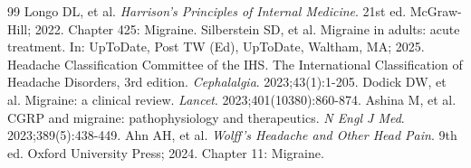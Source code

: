 \begin{thebibliography}{99}
 Longo DL, et al. \emph{Harrison's Principles of Internal Medicine}. 21st ed. McGraw-Hill; 2022. Chapter 425: Migraine.
 Silberstein SD, et al. Migraine in adults: acute treatment. In: UpToDate, Post TW (Ed), UpToDate, Waltham, MA; 2025.
 Headache Classification Committee of the IHS. The International Classification of Headache Disorders, 3rd edition. \emph{Cephalalgia}. 2023;43(1):1-205.
 Dodick DW, et al. Migraine: a clinical review. \emph{Lancet}. 2023;401(10380):860-874.
 Ashina M, et al. CGRP and migraine: pathophysiology and therapeutics. \emph{N Engl J Med}. 2023;389(5):438-449.
 Ahn AH, et al. \emph{Wolff's Headache and Other Head Pain}. 9th ed. Oxford University Press; 2024. Chapter 11: Migraine.
\end{thebibliography}
